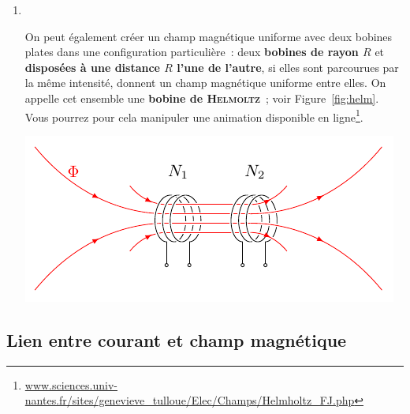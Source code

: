 \documentclass[../../main/main.tex]{subfiles}
\begin{document}
\begin{enumerate}
	\item
	      ~
	      \smallbreak
	      \vspace{-15pt}
	      \noindent
	      \begin{minipage}[c]{.60\linewidth}
		      On peut également créer un champ magnétique uniforme avec deux bobines
		      plates dans une configuration particulière~: deux \textbf{bobines de
			      rayon $R$} et \textbf{disposées à une distance $R$ l'une de l'autre}, si
		      elles sont parcourues par la même intensité, donnent un champ magnétique
		      uniforme entre elles. On appelle cet ensemble une \textbf{bobine de
			      \textsc{Helmoltz}}~; voir Figure~\ref{fig:helm}.
		      Vous pourrez pour cela manipuler une animation disponible en
		      ligne\footnote{\url{www.sciences.univ-nantes.fr/sites/genevieve_tulloue/Elec/Champs/Helmholtz_FJ.php}}.
	      \end{minipage}
	      \hfill
	      \begin{minipage}[c]{.38\linewidth}
		      \begin{center}
			      \includegraphics[width=\linewidth]{helmoltz}
			      \label{fig:helm}
		      \end{center}

	      \end{minipage}
\end{enumerate}


\subsection{Lien entre courant et champ magnétique}
\label{ssec:lienicour}
\end{document}
